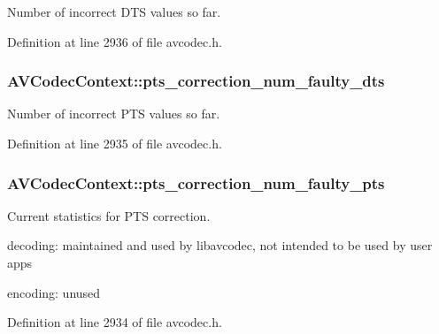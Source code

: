 Number of incorrect D\+TS values so far. 



Definition at line 2936 of file avcodec.\+h.

\subsubsection[{\texorpdfstring{pts\+\_\+correction\+\_\+num\+\_\+faulty\+\_\+dts}{pts_correction_num_faulty_dts}}]{ A\+V\+Codec\+Context\+::pts\+\_\+correction\+\_\+num\+\_\+faulty\+\_\+dts}\hypertarget{struct_a_v_codec_context_a0de395898981d1bc1edad3198fb64b30}{}\label{struct_a_v_codec_context_a0de395898981d1bc1edad3198fb64b30}


Number of incorrect P\+TS values so far. 



Definition at line 2935 of file avcodec.\+h.

\subsubsection[{\texorpdfstring{pts\+\_\+correction\+\_\+num\+\_\+faulty\+\_\+pts}{pts_correction_num_faulty_pts}}]{ A\+V\+Codec\+Context\+::pts\+\_\+correction\+\_\+num\+\_\+faulty\+\_\+pts}\hypertarget{struct_a_v_codec_context_a6d940d300cd7aca6ae9a9af9ba58e5cc}{}\label{struct_a_v_codec_context_a6d940d300cd7aca6ae9a9af9ba58e5cc}
Current statistics for P\+TS correction.
\begin{DoxyItemize}
\item decoding\+: maintained and used by libavcodec, not intended to be used by user apps
\item encoding\+: unused 
\end{DoxyItemize}

Definition at line 2934 of file avcodec.\+h.

